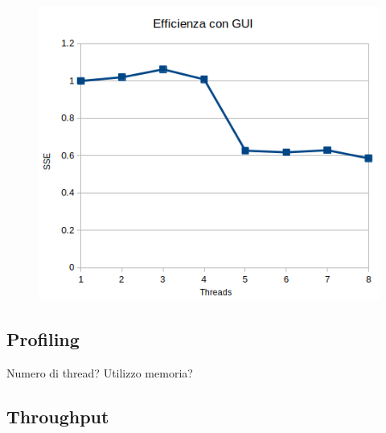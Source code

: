 \documentclass[12pt,a4paper,oneside]{article}
\begin{document}
	\begin{figure}[!ht]
		\centering
		\includegraphics[width=0.7\linewidth]{sse-gui}
		\caption{}
		\label{fig:sse-gui}
	\end{figure}
	
	\subsection{Profiling}
	Numero di thread?
	Utilizzo memoria?
	\subsection{Throughput}
\end{document}
